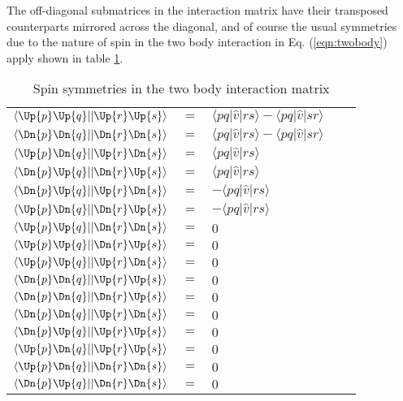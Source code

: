 The off-diagonal submatrices in the interaction matrix have their transposed counterparts mirrored across the diagonal, and of course the usual symmetries due to the nature of spin in the two body interaction in Eq. (\ref{eqn:twobody}) apply shown in table \ref{tab:symmetries_t2}. 



\begin{table}[]
\centering
\caption{Spin symmetries in the two body interaction matrix}
\label{tab:symmetries_t2}
\begin{tabular}{lllll}
$\langle \Up{p} \Up{q} \vert \vert  \Up{r} \Up{s} \rangle $ & $=$ & $\langle pq \vert \hat{v} \vert rs \rangle - \langle pq \vert \hat{v} \vert sr \rangle$ \\  
$\langle \Dn{p} \Dn{q} \vert \vert  \Dn{r} \Dn{s} \rangle $ & $=$ & $\langle pq \vert \hat{v} \vert rs \rangle - \langle pq \vert \hat{v} \vert sr \rangle$ \\  
$\langle \Up{p} \Dn{q} \vert \vert  \Up{r} \Dn{s} \rangle $ & $=$ & $\langle pq \vert \hat{v} \vert rs \rangle$ \\  
$\langle \Dn{p} \Up{q} \vert \vert  \Dn{r} \Up{s} \rangle $ & $=$ & $\langle pq \vert \hat{v} \vert rs \rangle$ \\  
$\langle \Dn{p} \Up{q} \vert \vert  \Up{r} \Dn{s} \rangle $ & $=$ & $-\langle pq \vert \hat{v} \vert rs \rangle$ \\  
$\langle \Up{p} \Dn{q} \vert \vert  \Dn{r} \Up{s} \rangle $ & $=$ & $-\langle pq \vert \hat{v} \vert rs \rangle$ \\  
$\langle \Up{p} \Up{q} \vert \vert  \Dn{r} \Dn{s} \rangle $ & $=$ & $0$ \\  
$\langle \Up{p} \Up{q} \vert \vert  \Dn{r} \Up{s} \rangle $ & $=$ & $0$ \\  
$\langle \Up{p} \Up{q} \vert \vert  \Up{r} \Dn{s} \rangle $ & $=$ & $0$ \\  
$\langle \Dn{p} \Dn{q} \vert \vert  \Up{r} \Up{s} \rangle $ & $=$ & $0$ \\  
$\langle \Dn{p} \Dn{q} \vert \vert  \Dn{r} \Up{s} \rangle $ & $=$ & $0$ \\  
$\langle \Dn{p} \Dn{q} \vert \vert  \Up{r} \Dn{s} \rangle $ & $=$ & $0$ \\  
$\langle \Dn{p} \Up{q} \vert \vert  \Up{r} \Up{s} \rangle $ & $=$ & $0$ \\  
$\langle \Up{p} \Dn{q} \vert \vert  \Up{r} \Up{s} \rangle $ & $=$ & $0$ \\  
$\langle \Up{p} \Dn{q} \vert \vert  \Dn{r} \Dn{s} \rangle $ & $=$ & $0$ \\  
$\langle \Dn{p} \Up{q} \vert \vert  \Dn{r} \Dn{s} \rangle $ & $=$ & $0$ \\  
\end{tabular}
\end{table}


